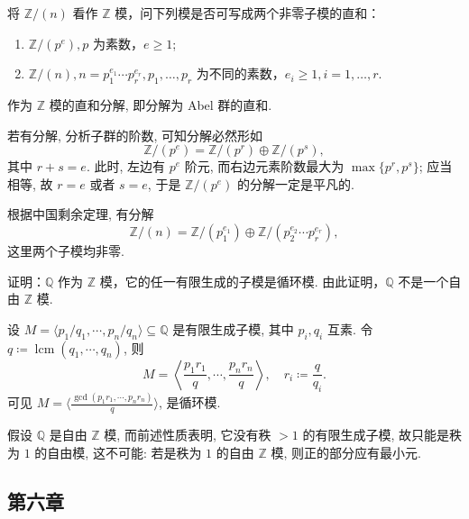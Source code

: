 \setcounter{pb}{19}
\begin{problem}
    将 $ \mathbb{Z}/(n) $ 看作 $ \mathbb{Z} $ 模，问下列模是否可写成两个非零子模的直和：
    \begin{enumerate}[label=(\roman*)]
        \item $ \mathbb{Z}/(p^e), p $ 为素数，$ e \geq 1 $;
        \item $ \mathbb{Z}/(n), n = p_1^{e_1} \cdots p_r^{e_r}, p_1, \dots, p_r $ 为不同的素数，$ e_i \geq 1, i = 1, \dots, r $.
    \end{enumerate}
\end{problem}

\begin{solution}
    作为 $\mathbb{Z}$ 模的直和分解, 即分解为 Abel 群的直和.
    \par 若有分解, 分析子群的阶数, 可知分解必然形如
        \[
            \mathbb{Z}/(p^{e})=\mathbb{Z}/(p^{r})\oplus\mathbb{Z}/(p^{s}),
        \]
    其中 $r+s=e$. 此时, 左边有 $p^{e}$ 阶元, 而右边元素阶数最大为 $\max\{p^{r},p^{s}\}$; 应当相等, 故 $r=e$ 或者 $s=e$, 于是 $\mathbb{Z}/(p^{e})$ 的分解一定是平凡的.
    \par 根据中国剩余定理, 有分解
        \[
            \mathbb{Z}/(n)=\mathbb{Z}/(p_{1}^{e_{1}})\oplus\mathbb{Z}/(p_{2}^{e_{2}}\cdots p_{r}^{e_{r}}),
        \]
    这里两个子模均非零. 
\end{solution}

\setcounter{pb}{20}
\begin{problem}
    证明：$ \mathbb{Q} $ 作为 $ \mathbb{Z} $ 模，它的任一有限生成的子模是循环模. 由此证明，$ \mathbb{Q} $ 不是一个自由 $ \mathbb{Z} $ 模. 
\end{problem}

\begin{solution}
    设 $M=\langle p_{1}/q_{1},\cdots,p_{n}/q_{n} \rangle \subseteq \mathbb{Q}$ 是有限生成子模, 其中 $p_{i},q_{i}$ 互素. 
    令 $q \coloneqq \operatorname{lcm}(q_{1},\cdots,q_{n})$, 则
        \[
            M=\left\langle \frac{p_{1}r_{1}}{q},\cdots,\frac{p_{n}r_{n}}{q} \right\rangle,\quad r_{i}\coloneqq \frac{q}{q_{i}}.
        \]
    可见 $M=\bigl\langle \frac{\gcd({p_{1}r_{1}},\cdots,{p_{n}r_{n}})}{q} \bigr\rangle$, 是循环模.
    \par 假设 $\mathbb{Q}$ 是自由 $\mathbb{Z}$ 模, 而前述性质表明, 它没有秩 $>1$ 的有限生成子模, 故只能是秩为 $1$ 的自由模, 这不可能: 若是秩为 $1$ 的自由 $\mathbb{Z}$ 模, 则正的部分应有最小元.
\end{solution}

\subsection{第六章}

